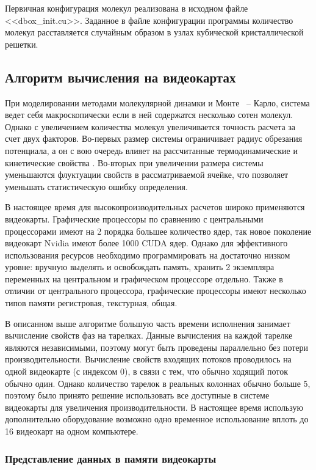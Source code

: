 Первичная конфигурация молекул реализована в исходном файле <<dbox\_init.cu>>. Заданное в файле конфигурации программы количество молекул расставляется случайным образом в узлах кубической кристаллической решетки. 

\subsection{Алгоритм вычисления на видеокартах}

При моделировании методами молекулярной динамки и Монте ~-- Карло, система ведет себя макроскопически если в ней содержатся несколько сотен молекул. Однако с увеличением количества молекул увеличивается точность расчета за счет двух факторов. Во-первых размер системы ограничивает радиус обрезания потенциала, а он с вою очередь влияет на рассчитанные термодинамические и кинетические свойства \cite{Moultos2016,Jamali2018}. Во-вторых при увеличении размера системы уменьшаются флуктуации свойств в рассматриваемой ячейке, что позволяет уменьшать статистическую ошибку определения.

В настоящее время для высокопроизводительных расчетов широко применяются видеокарты. Графические процессоры по сравнению с центральными процессорами имеют на 2 порядка большее количество ядер, так новое поколение видеокарт Nvidia имеют более 1000 CUDA ядер. Однако для эффективного использования ресурсов необходимо программировать на достаточно низком уровне: вручную выделять и освобождать память, хранить 2 экземпляра переменных на центральном и графическом процессоре отдельно. Также в отличии от центрального процессора, графические процессоры имеют несколько типов памяти регистровая, текстурная, общая.

В описанном выше алгоритме большую часть времени исполнения занимает вычисление свойств фаз на тарелках. Данные вычисления на каждой тарелке являются независимыми, поэтому могут быть проведены параллельно без потери производительности. Вычисление свойств входящих потоков проводилось на одной видеокарте (с индексом 0), в связи с тем, что обычно ходящий поток обычно один. Однако количество тарелок в реальных колоннах обычно больше 5, поэтому было принято решение использовать все доступные в системе видеокарты для увеличения производительности. В настоящее время использую дополнительно оборудование возможно одно временное использование вплоть до 16 видеокарт на одном компьютере.

\subsubsection{Представление данных в памяти видеокарты}

